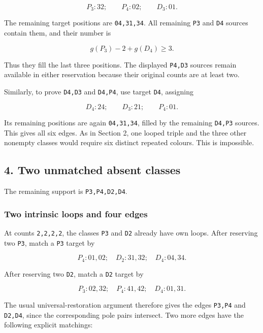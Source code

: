 \documentclass[
  10pt,
]{article}
\begin{document}
\[
P_3:32;\qquad P_4:02;\qquad D_3:01.
\]

The remaining target positions are \texttt{04,31,34}. All remaining
\texttt{P3} and \texttt{D4} sources contain them, and their number is

\[
g(P_3)-2+g(D_4)\ge3.
\]

Thus they fill the last three positions. The displayed \texttt{P4,D3}
sources remain available in either reservation because their original
counts are at least two.

Similarly, to prove \texttt{D4,D3} and \texttt{D4,P4}, use target
\texttt{D4}, assigning

\[
D_4:24;\qquad D_3:21;\qquad P_4:01.
\]

Its remaining positions are again \texttt{04,31,34}, filled by the
remaining \texttt{D4,P3} sources. This gives all six edges. As in
Section 2, one looped triple and the three other nonempty classes would
require six distinct repeated colours. This is impossible.

\hypertarget{two-unmatched-absent-classes}{%
\subsection*{4. Two unmatched absent
classes}\label{two-unmatched-absent-classes}}

The remaining support is \texttt{P3,P4,D2,D4}.

\hypertarget{two-intrinsic-loops-and-four-edges}{%
\subsubsection*{Two intrinsic loops and four
edges}\label{two-intrinsic-loops-and-four-edges}}

At counts \texttt{2,2,2,2}, the classes \texttt{P3} and \texttt{D2}
already have own loops. After reserving two \texttt{P3}, match a
\texttt{P3} target by

\[
P_4:01,02;\quad D_2:31,32;\quad D_4:04,34.
\]

After reserving two \texttt{D2}, match a \texttt{D2} target by

\[
P_3:02,32;\quad P_4:41,42;\quad D_4:01,31.
\]

The usual universal-restoration argument therefore gives the edges
\texttt{P3,P4} and \texttt{D2,D4}, since the corresponding pole pairs
intersect. Two more edges have the following explicit matchings:
\end{document}
